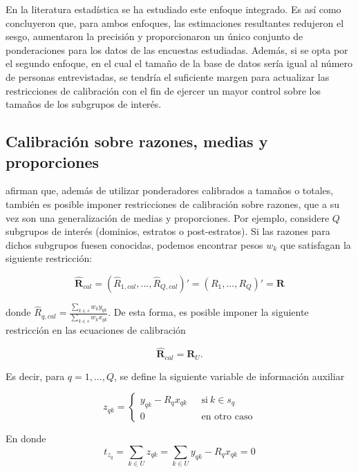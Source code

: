 \documentclass[
  12pt,
  spanish,
]{book}
\begin{document}
En la literatura estadística se ha estudiado este enfoque integrado. Es así como \citet{Neethling_Galpin_2006} concluyeron que, para ambos enfoques, las estimaciones resultantes redujeron el sesgo, aumentaron la precisión y proporcionaron un único conjunto de ponderaciones para los datos de las encuestas estudiadas. Además, si se opta por el segundo enfoque, en el cual el tamaño de la base de datos sería igual al número de personas entrevistadas, se tendría el suficiente margen para actualizar las restricciones de calibración con el fin de ejercer un mayor control sobre los tamaños de los subgrupos de interés.

\hypertarget{calibraciuxf3n-sobre-razones-medias-y-proporciones}{%
\subsection{Calibración sobre razones, medias y proporciones}\label{calibraciuxf3n-sobre-razones-medias-y-proporciones}}

\citet{Gutierrez_Zhang_Rodriguez_2016} afirman que, además de utilizar ponderadores calibrados a tamaños o totales, también es posible imponer restricciones de calibración sobre razones, que a su vez son una generalización de medias y proporciones. Por ejemplo, considere \(Q\) subgrupos de interés (dominios, estratos o post-estratos). Si las razones para dichos subgrupos fuesen conocidas, podemos encontrar pesos \(w_k\) que satisfagan la siguiente restricción:

\[
\hat{\textbf{R}}_{cal} = (\hat{R}_{1,cal},...,\hat{R}_{Q,cal})'= (R_1,...,R_Q)'= \textbf{R}
\]

donde \(\hat{R}_{q,cal} = \frac{\sum_{k \in s}w_ky_{qk}}{\sum_{k \in s}w_kx_{qk}}\). De esta forma, es posible imponer la siguiente restricción en las ecuaciones de calibración

\[
\hat{\textbf{R}}_{cal} = \textbf{R}_U.
\]

Es decir, para \(q = 1,..., Q\), se define la siguiente variable de información auxiliar

\begin{equation*}
z_{qk} = 
\begin{cases} 
y_{qk} - R_qx_{qk} \ \ \ &\text{si} \ k \in s_q \\ 
0 &\text{en otro caso}
\end{cases}
\end{equation*}

En donde
\[
t_{z_q} = \sum_{k \in U}z_{qk} = \sum_{k \in U}y_{qk} - R_qx_{qk} = 0
\]
\end{document}

